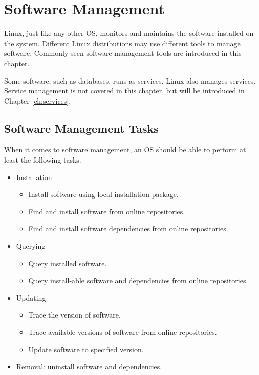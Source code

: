 \chapter{Software Management} \label{ch:software-management}

Linux, just like any other OS, monitors and maintains the software installed on the system. Different Linux distributions may use different tools to manage software. Commonly seen software management tools are introduced in this chapter. 

Some software, such as databases, runs as services. Linux also manages services. Service management is not covered in this chapter, but will be introduced in Chapter \ref{ch:services}.

\section{Software Management Tasks}

When it comes to software management, an OS should be able to perform at least the following tasks.
\begin{itemize}
	\item Installation
		\begin{itemize}
			\item Install software using local installation package.
			\item Find and install software from online repositories.
			\item Find and install software dependencies from online repositories.
		\end{itemize}
	\item Querying
		\begin{itemize}
			\item Query installed software.
			\item Query install-able software and dependencies from online repositories.
		\end{itemize}
	\item Updating
		\begin{itemize}
			\item Trace the version of software.
			\item Trace available versions of software from online repositories.
			\item Update software to specified version.
		\end{itemize}
	\item Removal: uninstall software and dependencies.
\end{itemize}

